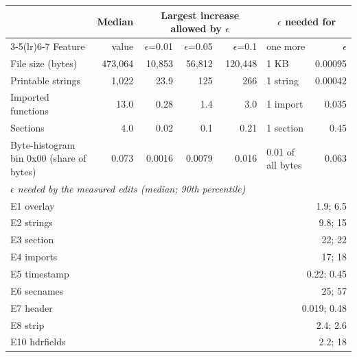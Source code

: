 \begin{tabular}{lrrrrlr}
\toprule
 & Median & \multicolumn{3}{c}{Largest increase allowed by $\epsilon$} & \multicolumn{2}{c}{$\epsilon$ needed for} \\
\cmidrule(lr){3-5}\cmidrule(lr){6-7}
Feature & value & $\epsilon$=0.01 & $\epsilon$=0.05 & $\epsilon$=0.1 & one more & $\epsilon$ \\
\midrule
File size (bytes) & 473{,}064 & 10{,}853 & 56{,}812 & 120{,}448 & 1 KB & 0.00095 \\
Printable strings & 1{,}022 & 23.9 & 125 & 266 & 1 string & 0.00042 \\
Imported functions & 13.0 & 0.28 & 1.4 & 3.0 & 1 import & 0.035 \\
Sections & 4.0 & 0.02 & 0.1 & 0.21 & 1 section & 0.45 \\
Byte-histogram bin 0x00 (share of bytes) & 0.073 & 0.0016 & 0.0079 & 0.016 & 0.01 of all bytes & 0.063 \\
\midrule
\multicolumn{7}{l}{\emph{$\epsilon$ needed by the measured edits (median; 90th percentile)}} \\
\multicolumn{5}{l}{\quad E1 overlay} & \multicolumn{2}{r}{1.9; 6.5} \\
\multicolumn{5}{l}{\quad E2 strings} & \multicolumn{2}{r}{9.8; 15} \\
\multicolumn{5}{l}{\quad E3 section} & \multicolumn{2}{r}{22; 22} \\
\multicolumn{5}{l}{\quad E4 imports} & \multicolumn{2}{r}{17; 18} \\
\multicolumn{5}{l}{\quad E5 timestamp} & \multicolumn{2}{r}{0.22; 0.45} \\
\multicolumn{5}{l}{\quad E6 secnames} & \multicolumn{2}{r}{25; 57} \\
\multicolumn{5}{l}{\quad E7 header} & \multicolumn{2}{r}{0.019; 0.48} \\
\multicolumn{5}{l}{\quad E8 strip} & \multicolumn{2}{r}{2.4; 2.6} \\
\multicolumn{5}{l}{\quad E10 hdrfields} & \multicolumn{2}{r}{2.2; 18} \\
\bottomrule
\end{tabular}
